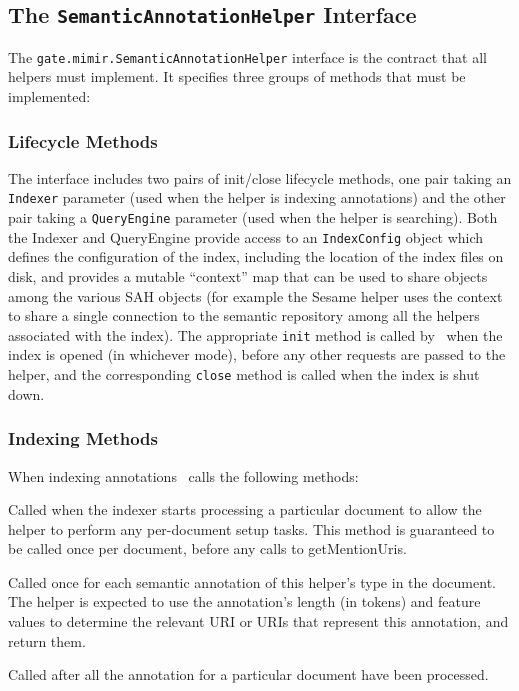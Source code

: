 \subsection{The {\tt SemanticAnnotationHelper} Interface}

The {\tt gate.mimir.SemanticAnnotationHelper} interface is the contract that
all helpers must implement.  It specifies three groups of methods that must be
implemented:

\subsubsection*{Lifecycle Methods}

The interface includes two pairs of init/close lifecycle methods, one pair
taking an {\tt Indexer} parameter (used when the helper is indexing
annotations) and the other pair taking a {\tt QueryEngine} parameter (used when
the helper is searching).  Both the Indexer and QueryEngine provide access to
an {\tt IndexConfig} object which defines the configuration of the index,
including the location of the index files on disk, and provides a mutable
``context'' map that can be used to share objects among the various SAH objects
(for example the Sesame helper uses the context to share a single connection to
the semantic repository among all the helpers associated with the index).  The
appropriate {\tt init} method is called by \Mimir\ when the index is opened (in
whichever mode), before any other requests are passed to the helper, and the
corresponding {\tt close} method is called when the index is shut down.

\subsubsection*{Indexing Methods}

When indexing annotations \Mimir\ calls the following methods:

\bde
\item[documentStart(document)] Called when the indexer starts processing a
  particular document to allow the helper to perform any per-document setup
  tasks.  This method is guaranteed to be called once per document, before any
  calls to getMentionUris.
\item[getMentionUris(annotation, length, indexer)] Called once for each
  semantic annotation of this helper's type in the document.  The helper is
  expected to use the annotation's length (in tokens) and feature values to
  determine the relevant URI or URIs that represent this annotation, and return
  them. 
\item[documentEnd()] Called after all the annotation for a particular document
  have been processed.
\ede

